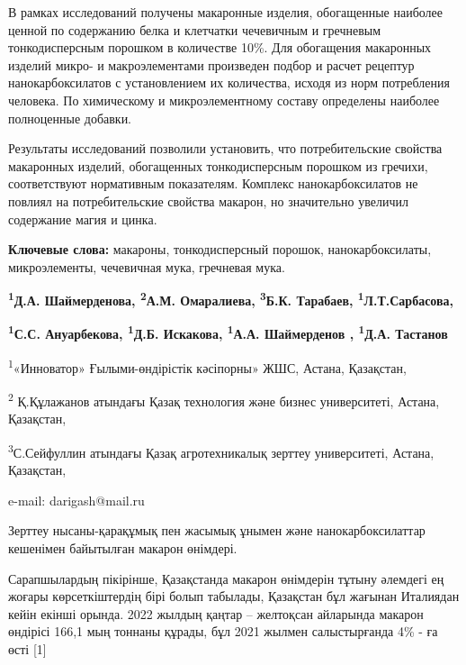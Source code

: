 В рамках исследований получены макаронные изделия, обогащенные наиболее
ценной по содержанию белка и клетчатки чечевичным и гречневым
тонкодисперсным порошком в количестве 10\%. Для обогащения макаронных
изделий микро- и макроэлементами произведен подбор и расчет рецептур
нанокарбоксилатов с установлением их количества, исходя из норм
потребления человека. По химическому и микроэлементному составу
определены наиболее полноценные добавки.

Результаты исследований позволили установить, что потребительские
свойства макаронных изделий, обогащенных тонкодисперсным порошком из
гречихи, соответствуют нормативным показателям. Комплекс
нанокарбоксилатов не повлиял на потребительские свойства макарон, но
значительно увеличил содержание магия и цинка.

{\bfseries Ключевые слова:} макароны, тонкодисперсный порошок,
нанокарбоксилаты, микроэлементы, чечевичная мука, гречневая мука.

\begin{center}

{\bfseries \textsuperscript{1}Д.А. Шаймерденова\envelope,
\textsuperscript{2}А.М. Омаралиева, \textsuperscript{3}Б.К. Тарабаев,
\textsuperscript{1}Л.Т.Сарбасова,}

{\bfseries \textsuperscript{1}С.С. Ануарбекова, \textsuperscript{1}Д.Б.
Искакова, \textsuperscript{1}А.А. Шаймерденов , \textsuperscript{1}Д.А.
Тастанов}

\textsuperscript{1}«Инноватор» Ғылыми-өндірістік кәсіпорны» ЖШС, Астана,
Қазақстан,

\textsuperscript{2} Қ.Құлажанов атындағы Қазақ технология және бизнес
университеті, Астана, Қазақстан,

\textsuperscript{3}С.Сейфуллин атындағы Қазақ агротехникалық зерттеу
университеті, Астана, Қазақстан,

e-mail: darigash@mail.ru
\end{center}

Зерттеу нысаны-қарақұмық пен жасымық ұнымен және нанокарбоксилаттар
кешенімен байытылған макарон өнімдері.

Сарапшылардың пікірінше, Қазақстанда макарон өнімдерін тұтыну әлемдегі
ең жоғары көрсеткіштердің бірі болып табылады, Қазақстан бұл жағынан
Италиядан кейін екінші орында. 2022 жылдың қаңтар -- желтоқсан айларында
макарон өндірісі 166,1 мың тоннаны құрады, бұл 2021 жылмен салыстырғанда
4\% - ға өсті {[}1{]}

